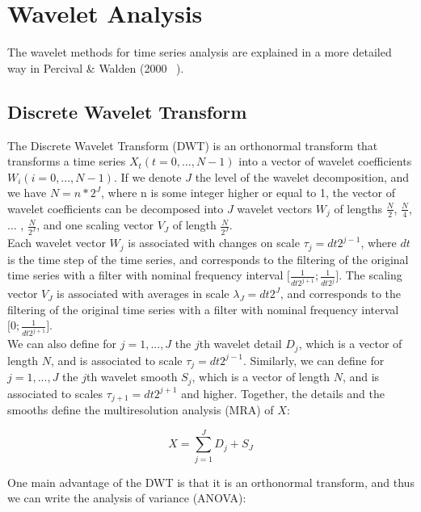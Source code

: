 \documentclass[methods.tex]{subfiles}
\begin{document}
\chapter{Wavelet Analysis}

The wavelet methods for time series analysis are explained in a more detailed way in Percival \& Walden (2000 ~\cite{PER_2000}). \\

\section{Discrete Wavelet Transform}

The Discrete Wavelet Transform (DWT) is an orthonormal transform that transforms a time series $X_t \left( t = 0, ... , N - 1 \right)$ into a vector of wavelet coefficients $W_i \left( i = 0 , ... , N - 1 \right)$. If we denote $J$ the level of the wavelet decomposition, and we have $N = n* 2^J$, where n is some integer higher or equal to 1, the vector of wavelet coefficients can be decomposed into $J$ wavelet vectors $W_j$ of lengths $\frac{N}{2}$, $\frac{N}{4}$, ... , $\frac{N}{2^J}$, and one scaling vector $V_J$ of length $\frac{N}{2^J}$. \\

Each wavelet vector $W_j$ is associated with changes on scale $\tau_j = dt 2^{j - 1}$, where $dt$ is the time step of the time series, and corresponds to the filtering of the original time series with a filter with nominal frequency interval $\lbrack \frac{1}{dt 2^{j + 1}} ; \frac{1}{dt 2^j} \rbrack$. The scaling vector $V_J$ is associated with averages in scale $\lambda_J = dt 2^J$, and corresponds to the filtering of the original time series with a filter with nominal frequency interval $\lbrack 0 ; \frac{1}{dt 2^{j + 1}} \rbrack$. \\

We can also define for $j = 1 , ... , J$ the $j$th wavelet detail $D_j$, which is a vector of length $N$, and is associated to scale $\tau_j = dt 2^{j - 1}$. Similarly, we can define for $j = 1 , ... , J$ the $j$th wavelet smooth $S_j$, which is a vector of length $N$, and is associated to scales $\tau_{j + 1} = dt 2^{j + 1}$ and higher. Together, the details and the smooths define the multiresolution analysis (MRA) of $X$:

\begin{equation}
X = \sum_{j = 1}^{J} D_j + S_J
\end{equation}

One main advantage of the DWT is that it is an orthonormal transform, and thus we can write the analysis of variance (ANOVA):
\end{document}
